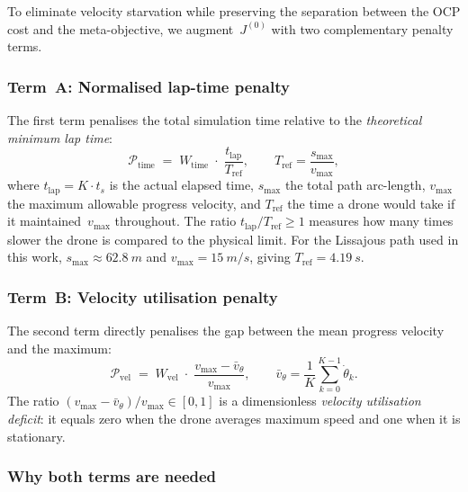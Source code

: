 To eliminate velocity starvation while preserving the separation
between the OCP cost and the meta-objective, we augment~$J^{(0)}$
with two complementary penalty terms.

\subsubsection{Term~A: Normalised lap-time penalty}

The first term penalises the total simulation time relative to
the \emph{theoretical minimum lap time}:
%
\begin{equation}
  \mathcal{P}_{\text{time}}
  \;=\;
  W_{\text{time}} \;\cdot\;
  \frac{t_{\text{lap}}}{T_{\text{ref}}},
  \qquad
  T_{\text{ref}} = \frac{s_{\max}}{v_{\max}},
  \label{eq:term_A}
\end{equation}
%
where $t_{\text{lap}} = K \cdot t_s$ is the actual elapsed time,
$s_{\max}$ the total path arc-length, $v_{\max}$ the maximum
allowable progress velocity, and $T_{\text{ref}}$ the time a
drone would take if it maintained~$v_{\max}$ throughout.
The ratio $t_{\text{lap}} / T_{\text{ref}} \ge 1$ measures how
many times slower the drone is compared to the physical limit.
For the Lissajous path used in this work,
$s_{\max} \approx \SI{62.8}{m}$ and $v_{\max} = \SI{15}{m/s}$,
giving $T_{\text{ref}} = \SI{4.19}{s}$.

\subsubsection{Term~B: Velocity utilisation penalty}

The second term directly penalises the gap between the mean
progress velocity and the maximum:
%
\begin{equation}
  \mathcal{P}_{\text{vel}}
  \;=\;
  W_{\text{vel}} \;\cdot\;
  \frac{v_{\max} - \bar{v}_\theta}{v_{\max}},
  \qquad
  \bar{v}_\theta = \frac{1}{K}\sum_{k=0}^{K-1} \dot\theta_k.
  \label{eq:term_B}
\end{equation}
%
The ratio $(v_{\max} - \bar{v}_\theta)/v_{\max} \in [0,1]$
is a dimensionless \emph{velocity utilisation deficit}: it equals
zero when the drone averages maximum speed and one when it is
stationary.

\subsubsection{Why both terms are needed}

